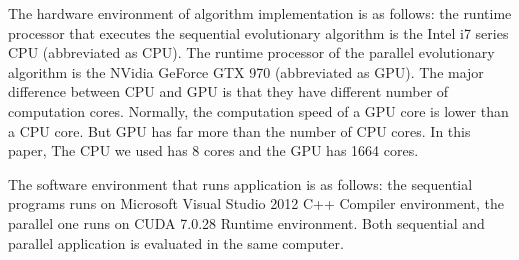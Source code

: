 The hardware environment of algorithm implementation is as follows: the runtime
processor that executes the sequential evolutionary algorithm is the Intel i7
series CPU (abbreviated as CPU). The runtime processor of the parallel
evolutionary algorithm is the NVidia GeForce GTX 970 (abbreviated as GPU). The
major difference between CPU and GPU is that they have different number of
computation cores. Normally, the computation speed of a GPU core is lower than a
CPU core. But GPU has far more than the number of CPU cores. In this paper, The
CPU we used has 8 cores and the GPU has 1664 cores.

The software environment that runs application is as follows: the sequential
programs runs on Microsoft Visual Studio 2012 C++ Compiler environment, the
parallel one runs on CUDA 7.0.28 Runtime environment. Both sequential and
parallel application is evaluated in the same computer.


